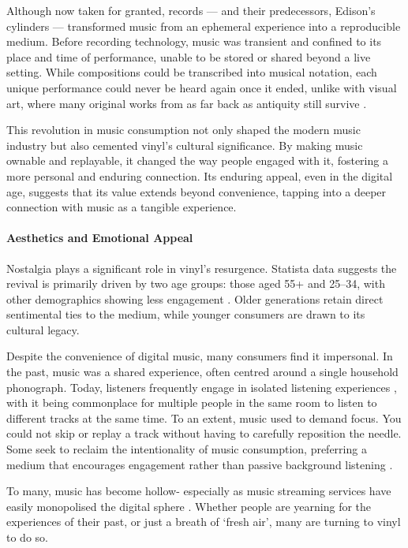     
            Although now taken for granted, records — and their predecessors, Edison's cylinders — transformed music from an ephemeral experience into a reproducible medium. Before recording technology, music was transient and confined to its place and time of performance, unable to be stored or shared beyond a live setting. While compositions could be transcribed into musical notation, each unique performance could never be heard again once it ended, unlike with visual art, where many original works from as far back as antiquity still survive \cite{jdbond}.
    
            This revolution in music consumption not only shaped the modern music industry but also cemented vinyl’s cultural significance. By making music ownable and replayable, it changed the way people engaged with it, fostering a more personal and enduring connection. Its enduring appeal, even in the digital age, suggests that its value extends beyond convenience, tapping into a deeper connection with music as a tangible experience.
    
            \paragraph{Aesthetics and Emotional Appeal}
    
                Nostalgia plays a significant role in vinyl's resurgence. Statista data suggests the revival is primarily driven by two age groups: those aged 55+ and 25--34, with other demographics showing less engagement \cite{Gotting2021}. Older generations retain direct sentimental ties to the medium, while younger consumers are drawn to its cultural legacy.
    
                Despite the convenience of digital music, many consumers find it impersonal. In the past, music was a shared experience, often centred around a single household phonograph. Today, listeners frequently engage in isolated listening experiences \cite{historyandrevivalofvinyls}, with it being commonplace for multiple people in the same room to listen to different tracks at the same time. To an extent, music used to demand focus. You could not skip or replay a track without having to carefully reposition the needle. Some seek to reclaim the intentionality of music consumption, preferring a medium that encourages engagement rather than passive background listening \cite{Liu2020}.
    
                To many, music has become hollow- especially as music streaming services have easily monopolised the digital sphere \cite{historyandrevivalofvinyls}. Whether people are  yearning for the experiences of their past, or just a breath of `fresh air', many are turning to vinyl to do so.
    
